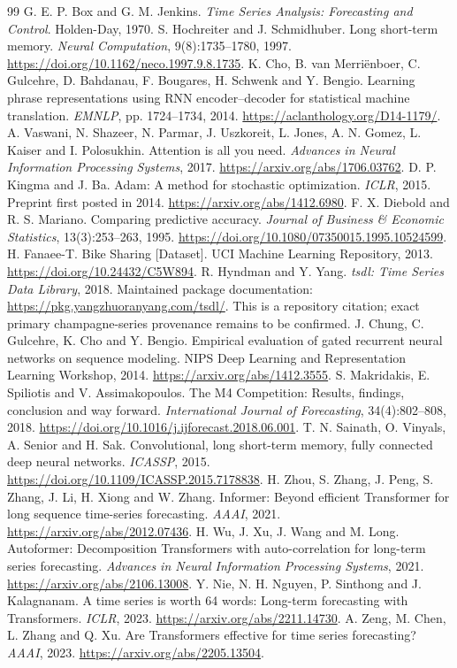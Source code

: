 \documentclass[10pt,a4paper]{article}
\begin{document}
\begin{thebibliography}{99}\small
{} G. E. P. Box and G. M. Jenkins. \emph{Time Series Analysis: Forecasting and Control}. Holden-Day, 1970.
 S. Hochreiter and J. Schmidhuber. Long short-term memory. \emph{Neural Computation}, 9(8):1735--1780, 1997. \url{https://doi.org/10.1162/neco.1997.9.8.1735}.
 K. Cho, B. van Merri\"enboer, C. Gulcehre, D. Bahdanau, F. Bougares, H. Schwenk and Y. Bengio. Learning phrase representations using RNN encoder--decoder for statistical machine translation. \emph{EMNLP}, pp. 1724--1734, 2014. \url{https://aclanthology.org/D14-1179/}.
 A. Vaswani, N. Shazeer, N. Parmar, J. Uszkoreit, L. Jones, A. N. Gomez, L. Kaiser and I. Polosukhin. Attention is all you need. \emph{Advances in Neural Information Processing Systems}, 2017. \url{https://arxiv.org/abs/1706.03762}.
 D. P. Kingma and J. Ba. Adam: A method for stochastic optimization. \emph{ICLR}, 2015. Preprint first posted in 2014. \url{https://arxiv.org/abs/1412.6980}.
 F. X. Diebold and R. S. Mariano. Comparing predictive accuracy. \emph{Journal of Business \& Economic Statistics}, 13(3):253--263, 1995. \url{https://doi.org/10.1080/07350015.1995.10524599}.
 H. Fanaee-T. Bike Sharing [Dataset]. UCI Machine Learning Repository, 2013. \url{https://doi.org/10.24432/C5W894}.
 R. Hyndman and Y. Yang. \emph{tsdl: Time Series Data Library}, 2018. Maintained package documentation: \url{https://pkg.yangzhuoranyang.com/tsdl/}. This is a repository citation; exact primary champagne-series provenance remains to be confirmed.
 J. Chung, C. Gulcehre, K. Cho and Y. Bengio. Empirical evaluation of gated recurrent neural networks on sequence modeling. NIPS Deep Learning and Representation Learning Workshop, 2014. \url{https://arxiv.org/abs/1412.3555}.
 S. Makridakis, E. Spiliotis and V. Assimakopoulos. The M4 Competition: Results, findings, conclusion and way forward. \emph{International Journal of Forecasting}, 34(4):802--808, 2018. \url{https://doi.org/10.1016/j.ijforecast.2018.06.001}.
 T. N. Sainath, O. Vinyals, A. Senior and H. Sak. Convolutional, long short-term memory, fully connected deep neural networks. \emph{ICASSP}, 2015. \url{https://doi.org/10.1109/ICASSP.2015.7178838}.
 H. Zhou, S. Zhang, J. Peng, S. Zhang, J. Li, H. Xiong and W. Zhang. Informer: Beyond efficient Transformer for long sequence time-series forecasting. \emph{AAAI}, 2021. \url{https://arxiv.org/abs/2012.07436}.
 H. Wu, J. Xu, J. Wang and M. Long. Autoformer: Decomposition Transformers with auto-correlation for long-term series forecasting. \emph{Advances in Neural Information Processing Systems}, 2021. \url{https://arxiv.org/abs/2106.13008}.
 Y. Nie, N. H. Nguyen, P. Sinthong and J. Kalagnanam. A time series is worth 64 words: Long-term forecasting with Transformers. \emph{ICLR}, 2023. \url{https://arxiv.org/abs/2211.14730}.
 A. Zeng, M. Chen, L. Zhang and Q. Xu. Are Transformers effective for time series forecasting? \emph{AAAI}, 2023. \url{https://arxiv.org/abs/2205.13504}.
\end{thebibliography}
\end{document}

